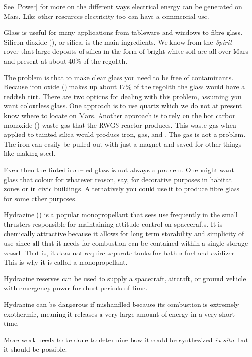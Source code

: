 See [Power] for more on the different ways electrical energy can be generated on Mars. Like other resources electricity too can have a commercial use.

Glass is useful for many applications from tableware and windows to fibre glass. Silicon dioxide (), or silica, is the main ingredients. We know from the {\it Spirit} rover that large deposits of silica in the form of bright white soil are all over Mars and present at about 40\% of the regolith.

The problem is that to make clear glass you need to be free of contaminants. Because iron oxide () makes up about 17\% of the regolith the glass would have a reddish tint. There are two options for dealing with this problem, assuming you want colourless glass. One approach is to use quartz which we do not at present know where to locate on Mars. Another approach is to rely on the hot carbon monoxide () waste gas that the RWGS reactor produces. This waste gas when applied to tainted silica would produce iron,  gas, and . The gas is not a problem. The iron can easily be pulled out with just a magnet and saved for other things like making steel.

Even then the tinted iron--red glass is not always a problem. One might want glass that colour for whatever reason, say, for decorative purposes in habitat zones or in civic buildings. Alternatively you could use it to produce fibre glass for some other purposes.

Hydrazine () is a popular monopropellant that sees use frequently in the small thrusters responsible for maintaining attitude control on spacecrafts. It is chemically attractive because it allows for long term storability and simplicity of use since all that it needs for combustion can be contained within a single storage vessel. That is, it does not require separate tanks for both a fuel and oxidizer. This is why it is called a monopropellant.

Hydrazine reserves can be used to supply a spacecraft, aircraft, or ground vehicle with emergency power for short periods of time.

Hydrazine can be dangerous if mishandled because its combustion is extremely exothermic, meaning it releases a very large amount of energy in a very short time.

More work needs to be done to determine how it could be synthesized {\it in situ}, but it should be possible.

